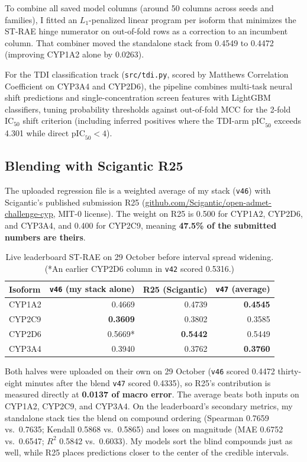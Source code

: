 \documentclass[11pt]{article}
\begin{document}
To combine all saved model columns (around 50 columns across seeds and families), I fitted an $L_1$-penalized linear program per isoform that minimizes the ST-RAE hinge numerator on out-of-fold rows as a correction to an incumbent column. That combiner moved the standalone stack from 0.4549 to 0.4472 (improving CYP1A2 alone by 0.0263).

For the TDI classification track (\texttt{src/tdi.py}, scored by Matthews Correlation Coefficient on CYP3A4 and CYP2D6), the pipeline combines multi-task neural shift predictions and single-concentration screen features with LightGBM classifiers, tuning probability thresholds against out-of-fold MCC for the 2-fold $\text{IC}_{50}$ shift criterion (including inferred positives where the TDI-arm $\text{pIC}_{50}$ exceeds 4.301 while direct $\text{pIC}_{50} < 4$).

\subsection{Blending with Scigantic R25}
The uploaded regression file is a weighted average of my stack (\texttt{v46}) with Scigantic's published submission R25 (\href{https://github.com/Scigantic/open-admet-challenge-cyp}{github.com/Scigantic/open-admet-challenge-cyp}, MIT-0 license). The weight on R25 is 0.500 for CYP1A2, CYP2D6, and CYP3A4, and 0.400 for CYP2C9, meaning \textbf{47.5\% of the submitted numbers are theirs}.

\begin{table}[H]
\centering
\small
\begin{tabular}{lrrr}
\toprule
Isoform & \texttt{v46} (my stack alone) & R25 (Scigantic) & \texttt{v47} (average) \\
\midrule
CYP1A2 & 0.4669 & 0.4739 & \textbf{0.4545} \\
CYP2C9 & \textbf{0.3609} & 0.3802 & 0.3585 \\
CYP2D6 & 0.5669* & \textbf{0.5442} & 0.5449 \\
CYP3A4 & 0.3940 & 0.3762 & \textbf{0.3760} \\
\bottomrule
\end{tabular}
\caption{Live leaderboard ST-RAE on 29 October before interval spread widening. (*An earlier CYP2D6 column in \texttt{v42} scored 0.5316.)}
\label{tab:blend}
\end{table}

Both halves were uploaded on their own on 29 October (\texttt{v46} scored 0.4472 thirty-eight minutes after the blend \texttt{v47} scored 0.4335), so R25's contribution is measured directly at \textbf{0.0137 of macro error}. The average beats both inputs on CYP1A2, CYP2C9, and CYP3A4. On the leaderboard's secondary metrics, my standalone stack ties the blend on compound ordering (Spearman 0.7659 vs.\ 0.7635; Kendall 0.5868 vs.\ 0.5865) and loses on magnitude (MAE 0.6752 vs.\ 0.6547; $R^2$ 0.5842 vs.\ 0.6033). My models sort the blind compounds just as well, while R25 places predictions closer to the center of the credible intervals.
\end{document}
